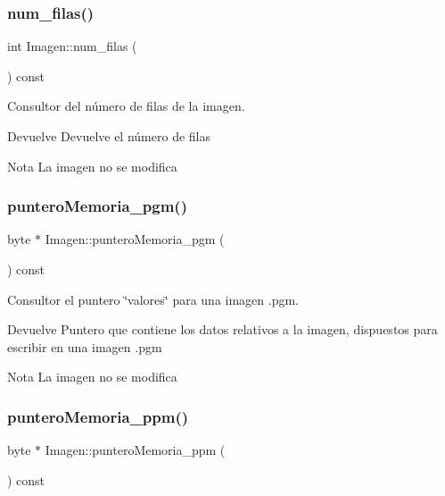 \subsubsection{\texorpdfstring{num\+\_\+filas()}{num\_filas()}}
{\footnotesize\ttfamily int Imagen\+::num\+\_\+filas (\begin{DoxyParamCaption}{ }\end{DoxyParamCaption}) const}



Consultor del número de filas de la imagen. 

\begin{DoxyReturn}{Devuelve}
Devuelve el número de filas 
\end{DoxyReturn}
\begin{DoxyNote}{Nota}
La imagen no se modifica 
\end{DoxyNote}
\mbox{\label{classImagen_a86cf24f7febd691382744ff38aacba0f}} 
\subsubsection{\texorpdfstring{puntero\+Memoria\+\_\+pgm()}{punteroMemoria\_pgm()}}
{\footnotesize\ttfamily byte $\ast$ Imagen\+::puntero\+Memoria\+\_\+pgm (\begin{DoxyParamCaption}{ }\end{DoxyParamCaption}) const}



Consultor el puntero \char`\"{}valores\char`\"{} para una imagen .pgm. 

\begin{DoxyReturn}{Devuelve}
Puntero que contiene los datos relativos a la imagen, dispuestos para escribir en una imagen .pgm 
\end{DoxyReturn}
\begin{DoxyNote}{Nota}
La imagen no se modifica 
\end{DoxyNote}
\mbox{\label{classImagen_a53c9e3df66783fc3ef3ee43039e540b7}} 
\subsubsection{\texorpdfstring{puntero\+Memoria\+\_\+ppm()}{punteroMemoria\_ppm()}}
{\footnotesize\ttfamily byte $\ast$ Imagen\+::puntero\+Memoria\+\_\+ppm (\begin{DoxyParamCaption}{ }\end{DoxyParamCaption}) const}



